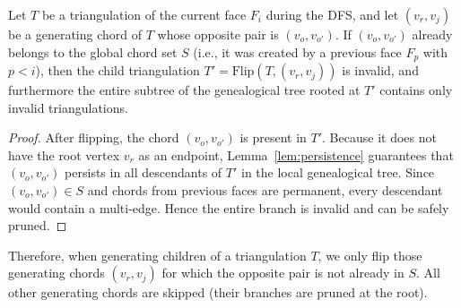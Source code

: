 \begin{lemma}
    \label{lem:pruning_opposite}
    Let \(T\) be a triangulation of the current face \(F_i\) during the DFS, and let \((v_r, v_j)\) be a generating chord of \(T\) whose opposite pair is \((v_o, v_{o'})\). 
    If \((v_o, v_{o'})\) already belongs to the global chord set \(S\) (i.e., it was created by a previous face \(F_p\) with \(p < i\)), then the child triangulation \(T' = \text{Flip}(T, (v_r, v_j))\) is invalid, and furthermore the entire subtree of the genealogical tree rooted at \(T'\) contains only invalid triangulations.
\end{lemma}

\begin{proof}
    After flipping, the chord \((v_o, v_{o'})\) is present in \(T'\). 
    Because it does not have the root vertex \(v_r\) as an endpoint, Lemma~\ref{lem:persistence} guarantees that \((v_o, v_{o'})\) persists in all descendants of \(T'\) in the local genealogical tree. 
    Since \((v_o, v_{o'}) \in S\) and chords from previous faces are permanent, every descendant would contain a multi-edge. 
    Hence the entire branch is invalid and can be safely pruned.
\end{proof}

Therefore, when generating children of a triangulation \(T\), we only flip those generating chords \((v_r, v_j)\) for which the opposite pair is not already in \(S\). 
All other generating chords are skipped (their branches are pruned at the root).

